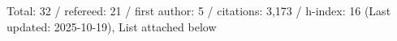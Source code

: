 Total: 32 / refereed: 21 / first author: 5 / citations: 3,173 / h-index: 16 (Last updated: 2025-10-19), List attached below